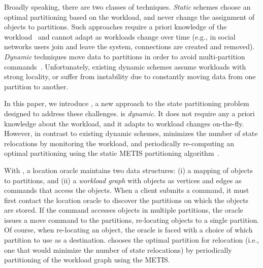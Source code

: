 
Broadly speaking, there are two classes of techniques. \emph{Static} schemes
choose an optimal partitioning based on the workload, and never change
the assignment of objects to partitions. Such approaches require a
priori knowledge of the workload~\cite{curino2010sch} and cannot adapt
as workloads change over time (e.g., in social networks users join and
leave the system, connections are created and removed).
\emph{Dynamic} techniques move data to partitions in order to avoid
multi-partition commands~\cite{long16}. Unfortunately, existing
dynamic schemes assume workloads with strong locality, or suffer
from instability due to constantly
moving data from one partition to another.


In this paper, we introduce \dynastar, a new approach to the state
partitioning problem designed to address these challenges.  \dynastar
is \emph{dynamic}. It does not require any a priori knowledge about
the workload, and it adapts to workload changes on-the-fly. However,
in contrast to existing dynamic schemes, \dynastar minimizes the
number of state relocations by monitoring the workload, and
periodically re-computing an optimal partitioning using the static
METIS partitioning algorithm~\cite{Abou-Rjeili:2006}.


With \dynastar, a location oracle maintains two data structures: (i) a
mapping of objects to partitions, and (ii) a \emph{workload graph}
with objects as vertices and edges as commands that access the
objects.  When a client submits a command, it must first contact the
location oracle to discover the partitions on which the objects are
stored.  If the command accesses objects in multiple partitions, the
oracle issues a move command to the partitions, re-locating objects to
a single partition. Of course, when re-locating an object, the oracle
is faced with a choice of which partition to use as a destination.
\dynastar chooses the optimal partition for relocation (i.e., one that
would minimize the number of state relocations) by periodically
partitioning of the workload graph using the METIS.





